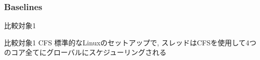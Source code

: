


\subsubsection{Baselines}
\label{sssec: baselines}

\begin{frame}{比較対象1}
    \begin{block}{比較対象1 CFS}
        標準的なLinuxのセットアップで, スレッドはCFSを使用して4つのコア全てにグローバルにスケジューリングされる
    \end{block}
\end{frame}

